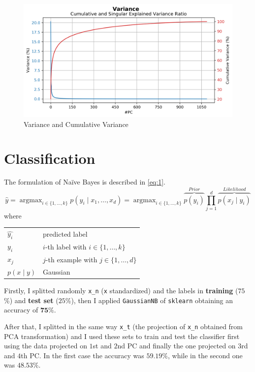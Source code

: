\documentclass[a4paper, 11pt]{article}
\makeatletter
\DeclareMathOperator*{\argmax}{argmax} %
\newenvironment{conditions}
{\par\vspace{\abovedisplayskip}\noindent\begin{tabular}{>{$}l<{$} @{${}={}$} l}}
	{\end{tabular}\par\vspace{\belowdisplayskip}}
\makeatother
\begin{document}
	\begin{figure}[ht!]
		\centering
		\includegraphics[height=0.4\paperwidth]{img/fig03.png}
		\caption{Variance and Cumulative Variance}
		\label{fig:variance}
	\end{figure}
	
	
	\section{Classification}
		
	The formulation of Na\"ive Bayes is described in \cref{eq:1}.
	\begin{equation} \label{eq:1}
		\hat{y}=\argmax_{i \in \{1,\dots,k\}} p ( y_i \mid x_1, \dots, x_d) = \argmax_{i \in \{1,\dots,k\}}\overbrace{p(y_i)}^{Prior} \prod_{j=1}^{d}\overbrace{p(x_j\mid y_i)}^{Likelihood}
	\end{equation}
	where
	\begin{conditions}
		\hat{y_i}	&	predicted label \\
		y_i			&	$i$-th label with $i \in \{1,\dots,k\}$\\
		x_j			&  	$j$-th example with $j \in \{1,\dots,d\}$   \\   
		p(x\mid y) 	&	Gaussian
	\end{conditions}
	
	Firstly, I splitted randomly \texttt{x\_n} (\texttt{x} standardized) and the labels in \textbf{training} ($75$\%) and \textbf{test set} ($25$\%), then I applied \texttt{GaussianNB} of \texttt{sklearn} obtaining an accuracy of $\boldsymbol{75\%}$.
	
	After that, I splitted in the same way \texttt{x\_t} (the projection of \texttt{x\_n} obtained from PCA transformation) and I used these sets to train and test the classifier first using the data projected on $1$st and $2$nd PC and finally the one projected on $3$rd and $4$th PC. In the first case the accuracy was $\boldsymbol{59.19\%}$, while in the second one was $\boldsymbol{48.53\%}$.
	
\end{document}
